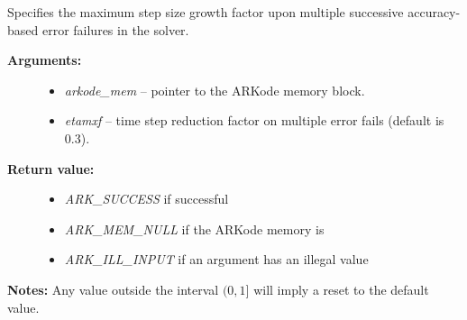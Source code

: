 \documentclass[letterpaper,10pt,english]{sphinxmanual}
\begin{document}
\begin{fulllineitems}
\label{c_interface/User_callable:ARKodeSetMaxEFailGrowth}
Specifies the maximum step size growth factor upon multiple successive
accuracy-based error failures in the solver.
\begin{description}
\item[{\textbf{Arguments:}}] \leavevmode\begin{itemize}
\item {} 
\emph{arkode\_mem} -- pointer to the ARKode memory block.

\item {} 
\emph{etamxf} -- time step reduction factor on multiple error fails (default is 0.3).

\end{itemize}

\item[{\textbf{Return value:}}] \leavevmode\begin{itemize}
\item {} 
\emph{ARK\_SUCCESS} if successful

\item {} 
\emph{ARK\_MEM\_NULL} if the ARKode memory is 

\item {} 
\emph{ARK\_ILL\_INPUT} if an argument has an illegal value

\end{itemize}

\end{description}

\textbf{Notes:} Any value outside the interval $(0,1]$ will imply a reset to the default value.

\end{fulllineitems}

\end{document}
